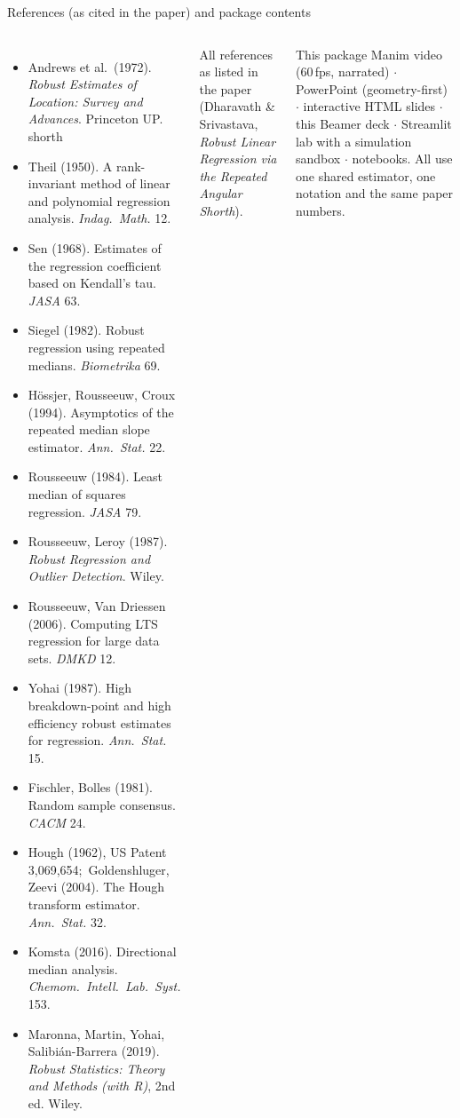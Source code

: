 \documentclass[aspectratio=169,9pt]{beamer}
\begin{document}
\begin{frame}{References (as cited in the paper) and package contents}
\small
\begin{columns}[T]
\begin{itemize}\setlength\itemsep{1.2pt}\scriptsize
\item Andrews et al.\ (1972). \emph{Robust Estimates of Location: Survey and Advances}. Princeton UP. \hfill\textcolor{mute}{shorth}
\item Theil (1950). A rank-invariant method of linear and polynomial regression analysis. \emph{Indag.\ Math.} 12.
\item Sen (1968). Estimates of the regression coefficient based on Kendall's tau. \emph{JASA} 63.
\item Siegel (1982). Robust regression using repeated medians. \emph{Biometrika} 69.
\item H\"ossjer, Rousseeuw, Croux (1994). Asymptotics of the repeated median slope estimator. \emph{Ann.\ Stat.} 22.
\item Rousseeuw (1984). Least median of squares regression. \emph{JASA} 79.
\item Rousseeuw, Leroy (1987). \emph{Robust Regression and Outlier Detection}. Wiley.
\item Rousseeuw, Van Driessen (2006). Computing LTS regression for large data sets. \emph{DMKD} 12.
\item Yohai (1987). High breakdown-point and high efficiency robust estimates for regression. \emph{Ann.\ Stat.} 15.
\item Fischler, Bolles (1981). Random sample consensus. \emph{CACM} 24.
\item Hough (1962), US Patent 3,069,654;\ Goldenshluger, Zeevi (2004). The Hough transform estimator. \emph{Ann.\ Stat.} 32.
\item Komsta (2016). Directional median analysis. \emph{Chemom.\ Intell.\ Lab.\ Syst.} 153.
\item Maronna, Martin, Yohai, Salibi\'an-Barrera (2019). \emph{Robust Statistics: Theory and Methods (with R)}, 2nd ed. Wiley.
\end{itemize}
{\sffamily\tiny\color{mute}All references as listed in the paper (Dharavath \& Srivastava, \emph{Robust Linear Regression via the Repeated Angular Shorth}).}
\begin{rkey}{This package}
Manim video (60\,fps, narrated) $\cdot$ PowerPoint (geometry-first) $\cdot$ interactive HTML slides $\cdot$ this Beamer deck $\cdot$ Streamlit lab with a simulation sandbox $\cdot$ notebooks. All use one shared estimator, one notation and the same paper numbers.
\end{rkey}
\end{columns}
\end{frame}
\end{document}
